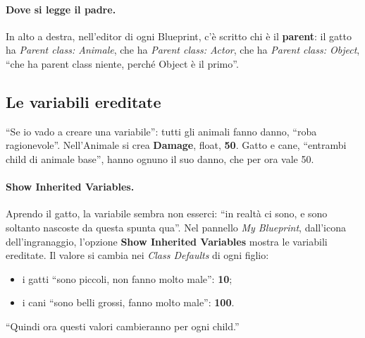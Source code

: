 \paragraph{Dove si legge il padre.} In alto a destra, nell'editor di ogni
Blueprint, c'è scritto chi è il \textbf{parent}: il gatto ha \emph{Parent class:
Animale}, che ha \emph{Parent class: Actor}, che ha \emph{Parent class: Object},
``che ha parent class niente, perché Object è il primo''.

\subsection{Le variabili ereditate}

``Se io vado a creare una variabile'': tutti gli animali fanno danno, ``roba
ragionevole''. Nell'Animale si crea \textbf{Damage}, float, \textbf{50}. Gatto e
cane, ``entrambi child di animale base'', hanno ognuno il suo danno, che per ora
vale 50.

\paragraph{Show Inherited Variables.} Aprendo il gatto, la variabile sembra non
esserci: ``in realtà ci sono, e sono soltanto nascoste da questa spunta qua''.
Nel pannello \emph{My Blueprint}, dall'icona dell'ingranaggio, l'opzione
\textbf{Show Inherited Variables} mostra le variabili ereditate. Il valore si
cambia nei \emph{Class Defaults} di ogni figlio:
\begin{itemize}
  \item i gatti ``sono piccoli, non fanno molto male'': \textbf{10};
  \item i cani ``sono belli grossi, fanno molto male'': \textbf{100}.
\end{itemize}
``Quindi ora questi valori cambieranno per ogni child.''

